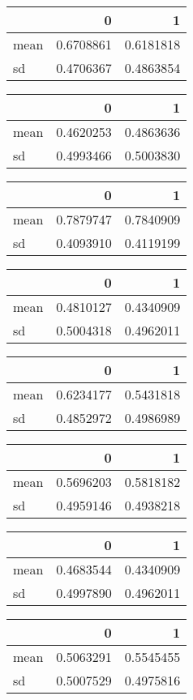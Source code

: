 \documentclass[]{article}
\begin{document}
\begin{table}[H]
\begin{tabular}[t]{lrr}
\toprule
  & 0 & 1\\
\midrule
mean & 0.6708861 & 0.6181818\\
sd & 0.4706367 & 0.4863854\\
\bottomrule
\end{tabular}
\centering
\begin{tabular}[t]{lrr}
\toprule
  & 0 & 1\\
\midrule
mean & 0.4620253 & 0.4863636\\
sd & 0.4993466 & 0.5003830\\
\bottomrule
\end{tabular}
\centering
\begin{tabular}[t]{lrr}
\toprule
  & 0 & 1\\
\midrule
mean & 0.7879747 & 0.7840909\\
sd & 0.4093910 & 0.4119199\\
\bottomrule
\end{tabular}
\centering
\begin{tabular}[t]{lrr}
\toprule
  & 0 & 1\\
\midrule
mean & 0.4810127 & 0.4340909\\
sd & 0.5004318 & 0.4962011\\
\bottomrule
\end{tabular}
\centering
\begin{tabular}[t]{lrr}
\toprule
  & 0 & 1\\
\midrule
mean & 0.6234177 & 0.5431818\\
sd & 0.4852972 & 0.4986989\\
\bottomrule
\end{tabular}
\centering
\begin{tabular}[t]{lrr}
\toprule
  & 0 & 1\\
\midrule
mean & 0.5696203 & 0.5818182\\
sd & 0.4959146 & 0.4938218\\
\bottomrule
\end{tabular}
\centering
\begin{tabular}[t]{lrr}
\toprule
  & 0 & 1\\
\midrule
mean & 0.4683544 & 0.4340909\\
sd & 0.4997890 & 0.4962011\\
\bottomrule
\end{tabular}
\centering
\begin{tabular}[t]{lrr}
\toprule
  & 0 & 1\\
\midrule
mean & 0.5063291 & 0.5545455\\
sd & 0.5007529 & 0.4975816\\

\end{tabular}
\end{table}
\end{document}
